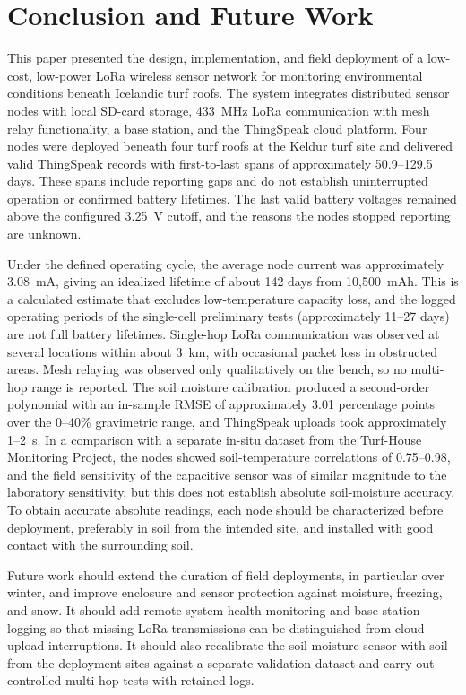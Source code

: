 \section{Conclusion and Future Work}
This paper presented the design, implementation, and field deployment of a low-cost, low-power LoRa wireless sensor network for monitoring environmental conditions beneath Icelandic turf roofs. The system integrates distributed sensor nodes with local SD-card storage, 433~MHz LoRa communication with mesh relay functionality, a base station, and the ThingSpeak cloud platform. Four nodes were deployed beneath four turf roofs at the Keldur turf site and delivered valid ThingSpeak records with first-to-last spans of approximately 50.9--129.5 days. These spans include reporting gaps and do not establish uninterrupted operation or confirmed battery lifetimes. The last valid battery voltages remained above the configured 3.25~V cutoff, and the reasons the nodes stopped reporting are unknown.

Under the defined operating cycle, the average node current was approximately 3.08~mA, giving an idealized lifetime of about 142 days from 10,500~mAh. This is a calculated estimate that excludes low-temperature capacity loss, and the logged operating periods of the single-cell preliminary tests (approximately 11--27 days) are not full battery lifetimes. Single-hop LoRa communication was observed at several locations within about 3~km, with occasional packet loss in obstructed areas. Mesh relaying was observed only qualitatively on the bench, so no multi-hop range is reported. The soil moisture calibration produced a second-order polynomial with an in-sample RMSE of approximately 3.01 percentage points over the 0--40\% gravimetric range, and ThingSpeak uploads took approximately 1--2~s. In a comparison with a separate in-situ dataset from the Turf-House Monitoring Project, the nodes showed soil-temperature correlations of 0.75--0.98, and the field sensitivity of the capacitive sensor was of similar magnitude to the laboratory sensitivity, but this does not establish absolute soil-moisture accuracy. To obtain accurate absolute readings, each node should be characterized before deployment, preferably in soil from the intended site, and installed with good contact with the surrounding soil.

Future work should extend the duration of field deployments, in particular over winter, and improve enclosure and sensor protection against moisture, freezing, and snow. It should add remote system-health monitoring and base-station logging so that missing LoRa transmissions can be distinguished from cloud-upload interruptions. It should also recalibrate the soil moisture sensor with soil from the deployment sites against a separate validation dataset and carry out controlled multi-hop tests with retained logs.
